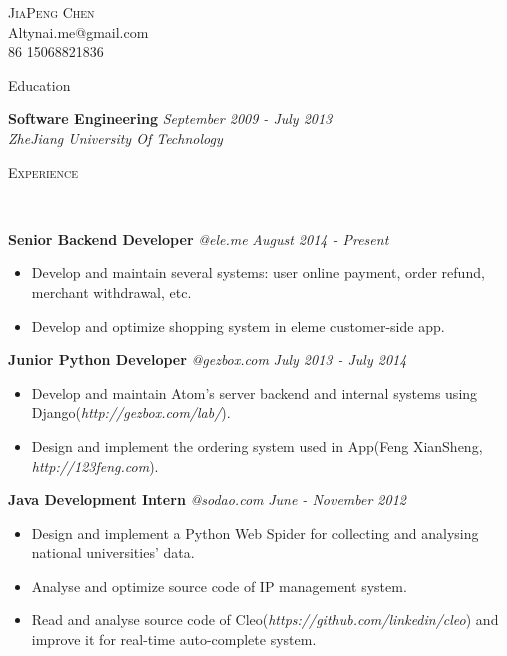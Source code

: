 ﻿\documentclass[9pt]{article}
\newenvironment{changemargin}[2]{%
  \begin{list}{}{%
    \setlength{\topsep}{0pt}%
    \setlength{\leftmargin}{#1}%
    \setlength{\rightmargin}{#2}%
    \setlength{\listparindent}{\parindent}%
    \setlength{\itemindent}{\parindent}%
    \setlength{\parsep}{\parskip}%
  }%
  \item[]}{\end{list}
}
\newcommand{\lineover}{
	\begin{changemargin}{-0.05in}{-0.05in}
		\vspace*{-8pt}
		\hrulefill \\
		\vspace*{-2pt}
	\end{changemargin}
}
\newcommand{\header}[1]{
	\begin{changemargin}{-0.5in}{-0.5in}
		\scshape{#1}\\
  	\lineover
	\end{changemargin}
}
\newcommand{\contact}[4]{
	\begin{changemargin}{-0.5in}{-0.5in}
		\begin{center}
			{\Large \scshape {#1}}\\ \smallskip
			{#2}\\ \smallskip
			{#3}\\ \smallskip
			{#4}\smallskip
		\end{center}
	\end{changemargin}
}
\newenvironment{body} {
	\vspace*{-16pt}
	\begin{changemargin}{-0.25in}{-0.5in}
  }
	{\end{changemargin}
}
\begin{document}
\contact{JiaPeng Chen}{Altynai.me@gmail.com}{86 15068821836}

\header{Education}
\begin{body}
	\vspace{14pt}
	\textbf{Software Engineering} \hfill \emph{September 2009 - July 2013} \\
	\emph{ZheJiang University Of Technology}\\
\end{body}

\smallskip

\header{Experience}

\begin{body}
	\vspace{14pt}

    \textbf{Senior Backend Developer} \emph{@ele.me} \hfill \emph{August 2014 - Present}\\
    \vspace*{-4pt}
    \begin{itemize} \itemsep -0pt  %
        \item Develop and maintain several systems: user online payment, order refund, merchant withdrawal, etc.
        \item Develop and optimize shopping system in eleme customer-side app.
    \end{itemize}

    \textbf{Junior Python Developer} \emph{@gezbox.com} \hfill \emph{July 2013 - July 2014}\\
    \vspace*{-4pt}
    \begin{itemize} \itemsep -0pt  %
        \item Develop and maintain Atom's server backend and internal systems using Django(\emph{http://gezbox.com/lab/}).
        \item Design and implement the ordering system used in App(Feng XianSheng, \emph{http://123feng.com}).
    \end{itemize}

	\textbf{Java Development Intern} \emph{@sodao.com} \hfill \emph{June - November 2012}\\
	\vspace*{-4pt}
	\begin{itemize} \itemsep -0pt  %
		\item Design and implement a Python Web Spider for collecting and analysing national universities' data.
        \item Analyse and optimize source code of IP management system.
        \item Read and analyse source code of Cleo(\emph{https://github.com/linkedin/cleo}) and improve it for real-time auto-complete system.
	\end{itemize}

\end{body}
\end{document}
